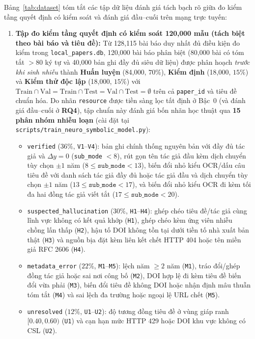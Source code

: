 Bảng~\ref{tab:dataset} tóm tắt các tập dữ liệu đánh giá tách bạch rõ giữa đo kiểm tầng quyết định có kiểm soát và đánh giá đầu--cuối trên mạng trực tuyến:
\begin{enumerate}
    \item \textbf{Tập đo kiểm tầng quyết định có kiểm soát 120,000 mẫu (tách biệt theo bài báo và tiêu đề):} Từ 128,115 bài báo duy nhất đủ điều kiện đo kiểm trong \texttt{local\_papers.db}, 120,000 bài báo phân biệt (80,000 bài có tóm tắt $>80$ ký tự và 40,000 bản ghi đầy đủ siêu dữ liệu) được phân hoạch \emph{trước khi sinh nhiễu} thành \textbf{Huấn luyện} (84,000, $70\%$), \textbf{Kiểm định} (18,000, $15\%$) và \textbf{Kiểm thử độc lập} (18,000, $15\%$) với $\text{Train} \cap \text{Val} = \text{Train} \cap \text{Test} = \text{Val} \cap \text{Test} = \emptyset$ trên cả \texttt{paper\_id} và tiêu đề chuẩn hóa. Do nhãn \texttt{resource} được tiền sàng lọc tất định ở Bậc~0 (và đánh giá đầu--cuối ở \textbf{RQ4}), tập chuẩn này đánh giá bốn nhãn học thuật qua \textbf{15 phân nhóm nhiễu loạn} (cài đặt tại \texttt{scripts/train\_neuro\_symbolic\_model.py}):
    \begin{itemize}
        \item \texttt{verified} ($36\%$, \texttt{V1}--\texttt{V4}): bản ghi chính thống nguyên bản với đầy đủ tác giả và $\Delta y = 0$ (\texttt{sub\_mode} $< 8$), rút gọn tên tác giả đầu kèm dịch chuyển tùy chọn $\pm 1$ năm ($8 \le \texttt{sub\_mode} < 13$), biến đổi nhỏ kiểu OCR/dấu câu tiêu đề với danh sách tác giả đầy đủ hoặc tác giả đầu và dịch chuyển tùy chọn $\pm 1$ năm ($13 \le \texttt{sub\_mode} < 17$), và biến đổi nhỏ kiểu OCR đi kèm tối đa hai đồng tác giả viết tắt ($17 \le \texttt{sub\_mode} < 20$).
        \item \texttt{suspected\_hallucination} ($30\%$, \texttt{H1}--\texttt{H4}): ghép chéo tiêu đề/tác giả cùng lĩnh vực không có kết quả khớp (\texttt{H1}), ghép chéo kèm ứng viên nhiễu chồng lấn thấp (\texttt{H2}), hậu tố DOI không tồn tại dưới tiền tố nhà xuất bản thật (\texttt{H3}) và nguồn bịa đặt kèm liên kết chết HTTP 404 hoặc tên miền giả RFC 2606 (\texttt{H4}).
        \item \texttt{metadata\_error} ($22\%$, \texttt{M1}--\texttt{M5}): lệch năm $\ge 2$ năm (\texttt{M1}), tráo đổi/ghép đồng tác giả hoặc sai nơi công bố (\texttt{M2}), DOI hợp lệ đi kèm tiêu đề biến đổi vừa phải (\texttt{M3}), biến đổi tiêu đề không DOI hoặc nhận định mâu thuẫn tóm tắt (\texttt{M4}) và sai lệch đa trường hoặc ngoại lệ URL chết (\texttt{M5}).
        \item \texttt{unresolved} ($12\%$, \texttt{U1}--\texttt{U2}): độ tương đồng tiêu đề ở vùng giáp ranh $[0.40, 0.60)$ (\texttt{U1}) và cạn hạn mức HTTP 429 hoặc DOI khu vực không có CSL (\texttt{U2}).

\end{itemize}
\end{enumerate}
